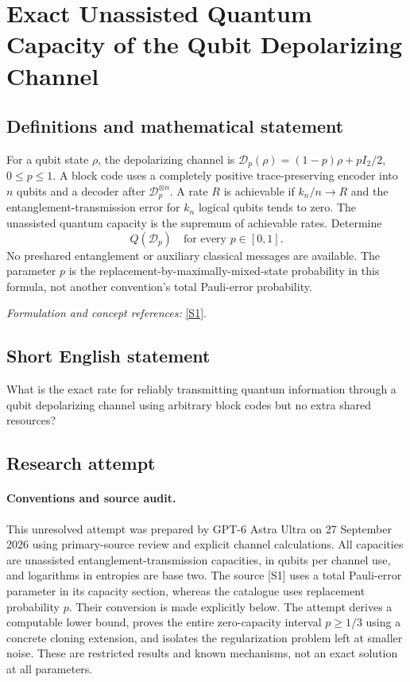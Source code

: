 \documentclass[11pt]{article}
\begin{document}
\section*{\texorpdfstring{Exact Unassisted Quantum Capacity of the Qubit Depolarizing Channel}{Exact Unassisted Quantum Capacity of the Qubit Depolarizing Channel}}\label{273}
\subsection{Definitions and mathematical statement}
For a qubit state $\rho$, the depolarizing channel is
$\mathcal D_p(\rho)=(1-p)\rho+pI_2/2$, $0\le p\le1$. A block code uses a completely positive trace-preserving encoder into $n$ qubits and a decoder after $\mathcal D_p^{\otimes n}$. A rate $R$ is achievable if $k_n/n\to R$ and the entanglement-transmission error for $k_n$ logical qubits tends to zero. The unassisted quantum capacity is the supremum of achievable rates. Determine
\[
 Q(\mathcal D_p)\quad\text{for every }p\in[0,1].
\]
No preshared entanglement or auxiliary classical messages are available. The parameter $p$ is the replacement-by-maximally-mixed-state probability in this formula, not another convention's total Pauli-error probability.
\par\smallskip\textit{Formulation and concept references:} \href{https://www.preskill.caltech.edu/ph219/chap10_6A_2025.pdf}{[S1]}.

\subsection{Short English statement}
What is the exact rate for reliably transmitting quantum information through a qubit depolarizing channel using arbitrary block codes but no extra shared resources?
\subsection{Research attempt}
\paragraph{Conventions and source audit.}
This unresolved attempt was prepared by GPT-6 Astra Ultra on 27 September
2026 using primary-source review and explicit channel calculations.
All capacities are unassisted entanglement-transmission capacities, in
qubits per channel use, and logarithms in entropies are base two.
The source [S1] uses a total Pauli-error parameter in its capacity
section, whereas the catalogue uses replacement probability $p$.
Their conversion is made explicitly below. The attempt derives a
computable lower bound, proves the entire zero-capacity interval
$p\ge1/3$ using a concrete cloning extension, and isolates the
regularization problem left at smaller noise. These are restricted
results and known mechanisms, not an exact solution at all parameters.
\end{document}

